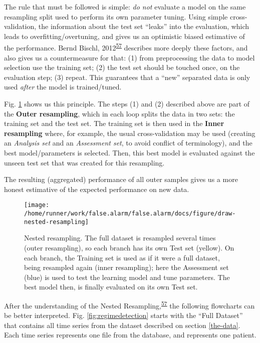 \documentclass[12pt,twoside]{fmupthesis}
\begin{document}
The rule that must be followed is simple: \emph{do not} evaluate a model on the same resampling split used
to perform its own parameter tuning. Using simple cross-validation, the information about the test
set ``leaks'' into the evaluation, which leads to overfitting/overtuning, and gives us an optimistic
biased estimative of the performance. Bernd Bischl, 2012\textsuperscript{\protect\hyperlink{ref-Bischl2012}{57}} describes more deeply these
factors, and also gives us a countermeasure for that: (1) from preprocessing the data to model
selection use the training set; (2) the test set should be touched once, on the evaluation step; (3)
repeat. This guarantees that a ``new'' separated data is only used \emph{after} the model is trained/tuned.

Fig. \ref{fig:nestedresampling} shows us this principle. The steps (1) and (2) described above are
part of the \textbf{Outer resampling}, which in each loop splits the data in two sets: the training set
and the test set. The training set is then used in the \textbf{Inner resampling} where, for example, the
usual cross-validation may be used (creating an \emph{Analysis set} and an \emph{Assessment set}, to avoid
conflict of terminology), and the best model/parameters is selected. Then, this best model is
evaluated against the unseen test set that was created for this resampling.

The resulting (aggregated) performance of all outer samples gives us a more honest estimative
of the expected performance on new data.
\begin{figure}

{\centering \texttt{[image: /home/runner/work/false.alarm/false.alarm/docs/figure/draw-nested-resampling]} 

}

\caption{Nested resampling. The full dataset is resampled several times (outer resampling), so each branch has its own Test set (yellow). On each branch, the Training set is used as if it were a full dataset, being resampled again (inner resampling); here the Assessment set (blue) is used to test the learning model and tune parameters. The best model then, is finally evaluated on its own Test set.}\label{fig:nestedresampling}
\end{figure}
After the understanding of the Nested Resampling,\textsuperscript{\protect\hyperlink{ref-Bischl2012}{57}} the following flowcharts can be
better interpreted. Fig. \ref{fig:regimedetection} starts with the ``Full Dataset'' that contains all
time series from the dataset described on section \ref{the-data}. Each time series represents one
file from the database, and represents one patient.
\end{document}
